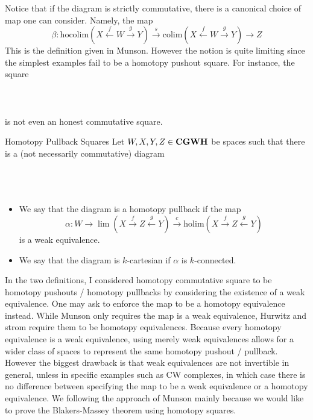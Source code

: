 \documentclass[a4paper]{article}
\begin{document}
Notice that if the diagram is strictly commutative, there is a canonical choice of map one can consider. Namely, the map $$\beta:\text{hocolim}(X\overset{f}{\leftarrow}W\overset{g}{\rightarrow}Y)\overset{s}{\longrightarrow}\text{colim}(X\overset{f}{\leftarrow}W\overset{g}{\rightarrow}Y)\to Z$$ This is the definition given in Munson. However the notion is quite limiting since the simplest examples fail to be a homotopy pushout square. For instance, the square \\~\\
\\~\\

is not even an honest commutative square. 

\begin{defn}{Homotopy Pullback Squares}{} Let $W,X,Y,Z\in\bold{CGWH}$ be spaces such that there is a (not necessarily commutative) diagram \\~\\
\\~\\
\begin{itemize}
\item We say that the diagram is a homotopy pullback if the map $$\alpha:W\to\lim(X\overset{f}{\rightarrow}Z\overset{g}{\leftarrow}Y)\overset{c}{\longrightarrow}\text{holim}(X\overset{f}{\rightarrow}Z\overset{g}{\leftarrow}Y)$$ is a weak equivalence. 
\item We say that the diagram is $k$-cartesian if $\alpha$ is $k$-connected. 
\end{itemize}
\end{defn}

In the two definitions, I considered homotopy commutative square to be homotopy pushouts / homotopy pullbacks by considering the existence of a weak equivalence. One may ask to enforce the map to be a homotopy equivalence instead. While Munson only requires the map is a weak equivalence, Hurwitz and strom require them to be homotopy equivalences. Because every homotopy equivalence is a weak equivalence, using merely weak equivalences allows for a wider class of spaces to represent the same homotopy pushout / pullback. However the biggest drawback is that weak equivalences are not invertible in general, unless in specific examples such as CW complexes, in which case there is no difference between specifying the map to be a weak equivalence or a homotopy equivalence. We following the approach of Munson mainly because we would like to prove the Blakers-Massey theorem using homotopy squares. \\~\\
\end{document}
